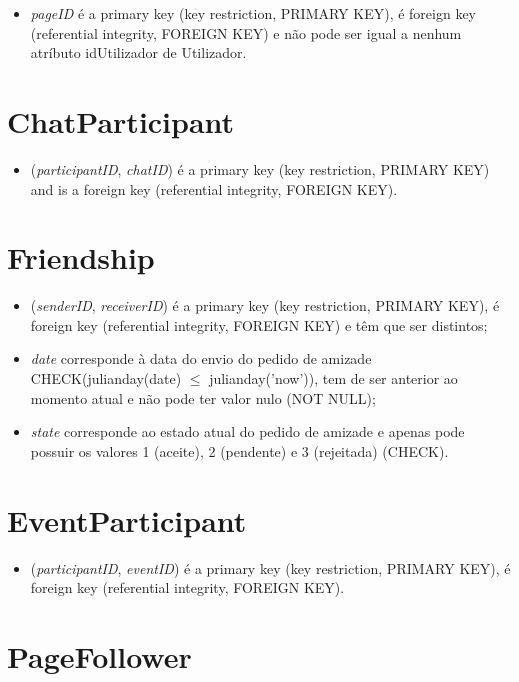 \documentclass[12pt]{report}
\begin{document}
\begin{itemize}
    \item \textit{pageID} é a primary key (key restriction, PRIMARY KEY), é foreign key (referential integrity, FOREIGN KEY) e não pode ser igual a nenhum atríbuto idUtilizador de Utilizador.
\end{itemize}

\section{ChatParticipant}

\begin{itemize}
    \item (\textit{participantID}, \textit{chatID}) é a primary key (key restriction, PRIMARY KEY) and is a foreign key (referential integrity, FOREIGN KEY).
\end{itemize}

\section{Friendship}

\begin{itemize}
    \item (\textit{senderID}, \textit{receiverID}) é a primary key (key restriction, PRIMARY KEY), é foreign key (referential integrity, FOREIGN KEY) e têm que ser distintos;
    \item \textit{date} corresponde à data do envio do pedido de amizade CHECK(julianday(date) $\leq$ julianday('now')), tem de ser anterior ao momento atual e não pode ter valor nulo (NOT NULL);
    \item \textit{state} corresponde ao estado atual do pedido de amizade e apenas pode possuir os valores 1 (aceite), 2 (pendente) e 3 (rejeitada) (CHECK).
\end{itemize}

\section{EventParticipant}

\begin{itemize}
    \item (\textit{participantID}, \textit{eventID}) é a primary key (key restriction, PRIMARY KEY), é foreign key (referential integrity, FOREIGN KEY).
\end{itemize}

\section{PageFollower}
\end{document}
